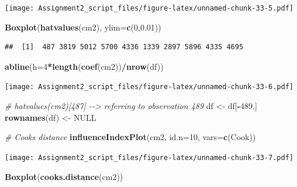 \documentclass[
]{article}
\newenvironment{Shaded}{\begin{snugshade}}{\end{snugshade}}
\newcommand{\AttributeTok}[1]{\textcolor[rgb]{0.13,0.29,0.53}{#1}}
\newcommand{\CommentTok}[1]{\textcolor[rgb]{0.56,0.35,0.01}{\textit{#1}}}
\newcommand{\ConstantTok}[1]{\textcolor[rgb]{0.56,0.35,0.01}{#1}}
\newcommand{\DecValTok}[1]{\textcolor[rgb]{0.00,0.00,0.81}{#1}}
\newcommand{\FloatTok}[1]{\textcolor[rgb]{0.00,0.00,0.81}{#1}}
\newcommand{\FunctionTok}[1]{\textcolor[rgb]{0.13,0.29,0.53}{\textbf{#1}}}
\newcommand{\NormalTok}[1]{#1}
\newcommand{\OtherTok}[1]{\textcolor[rgb]{0.56,0.35,0.01}{#1}}
\newcommand{\SpecialCharTok}[1]{\textcolor[rgb]{0.81,0.36,0.00}{\textbf{#1}}}
\newcommand{\StringTok}[1]{\textcolor[rgb]{0.31,0.60,0.02}{#1}}
\begin{document}
\texttt{[image: Assignment2\_script\_files/figure-latex/unnamed-chunk-33-5.pdf]}

\begin{Shaded}
\begin{Highlighting}[]
\FunctionTok{Boxplot}\NormalTok{(}\FunctionTok{hatvalues}\NormalTok{(cm2), }\AttributeTok{ylim=}\FunctionTok{c}\NormalTok{(}\DecValTok{0}\NormalTok{,}\FloatTok{0.01}\NormalTok{))}
\end{Highlighting}
\end{Shaded}

\begin{verbatim}
##  [1]  487 3819 5012 5700 4336 1339 2897 5896 4335 4695
\end{verbatim}

\begin{Shaded}
\begin{Highlighting}[]
\FunctionTok{abline}\NormalTok{(}\AttributeTok{h=}\DecValTok{4}\SpecialCharTok{*}\FunctionTok{length}\NormalTok{(}\FunctionTok{coef}\NormalTok{(cm2))}\SpecialCharTok{/}\FunctionTok{nrow}\NormalTok{(df))}
\end{Highlighting}
\end{Shaded}

\texttt{[image: Assignment2\_script\_files/figure-latex/unnamed-chunk-33-6.pdf]}

\begin{Shaded}
\begin{Highlighting}[]
\CommentTok{\# hatvalues(cm2)[487] {-}{-}\textgreater{} referring to observation 489}
\NormalTok{df }\OtherTok{\textless{}{-}}\NormalTok{ df[}\SpecialCharTok{{-}}\DecValTok{489}\NormalTok{,]}
\FunctionTok{rownames}\NormalTok{(df) }\OtherTok{\textless{}{-}} \ConstantTok{NULL}

\CommentTok{\# Cooks distance}
\FunctionTok{influenceIndexPlot}\NormalTok{(cm2, }\AttributeTok{id.n=}\DecValTok{10}\NormalTok{, }\AttributeTok{vars=}\FunctionTok{c}\NormalTok{(}\StringTok{\textquotesingle{}Cook\textquotesingle{}}\NormalTok{))}
\end{Highlighting}
\end{Shaded}

\texttt{[image: Assignment2\_script\_files/figure-latex/unnamed-chunk-33-7.pdf]}

\begin{Shaded}
\begin{Highlighting}[]
\FunctionTok{Boxplot}\NormalTok{(}\FunctionTok{cooks.distance}\NormalTok{(cm2))}
\end{Highlighting}
\end{Shaded}
\end{document}
